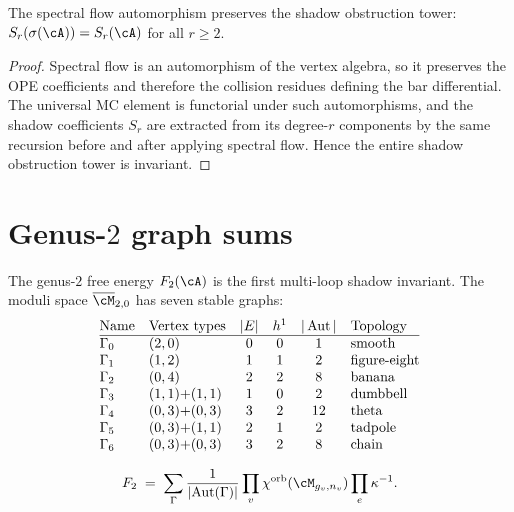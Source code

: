 \begin{proposition}
\label{prop:comp-n2-spectral-flow}
\ClaimStatusProvedHere
The spectral flow automorphism preserves the shadow obstruction tower:
$S_r(\sigma(\cA)) = S_r(\cA)$ for all $r \geq 2$.
\end{proposition}

\begin{proof}
Spectral flow is an automorphism of the vertex algebra, so it
preserves the OPE coefficients and therefore the collision residues
defining the bar differential. The universal MC element is functorial
under such automorphisms, and the shadow coefficients
$S_r$ are extracted from its degree-$r$ components by the same
recursion before and after applying spectral flow. Hence the entire
shadow obstruction tower is invariant.
\end{proof}


\section{Genus-$2$ graph sums}
\label{sec:comp-genus2}

The genus-$2$ free energy $F_2(\cA)$ is the first multi-loop
shadow invariant. The moduli space $\overline{\cM}_{2,0}$ has
seven stable graphs:
\[
\begin{array}{@{}llcccl@{}}
 \text{Name} & \text{Vertex types} & |E| & h^1
 & |\operatorname{Aut}| & \text{Topology} \\
\hline
 \Gamma_0 & (2,0) & 0 & 0 & 1 & \text{smooth} \\
 \Gamma_1 & (1,2) & 1 & 1 & 2 & \text{figure-eight} \\
 \Gamma_2 & (0,4) & 2 & 2 & 8 & \text{banana} \\
 \Gamma_3 & (1,1){+}(1,1) & 1 & 0 & 2 & \text{dumbbell} \\
 \Gamma_4 & (0,3){+}(0,3) & 3 & 2 & 12 & \text{theta} \\
 \Gamma_5 & (0,3){+}(1,1) & 2 & 1 & 2 & \text{tadpole} \\
 \Gamma_6 & (0,3){+}(0,3) & 3 & 2 & 8 & \text{chain}
\end{array}
\]

\begin{equation}\label{eq:comp-f2-graph-sum}
 F_2 \;=\;
 \sum_{\Gamma} \frac{1}{|\!\operatorname{Aut}(\Gamma)|}
 \prod_{v} \chi^{\mathrm{orb}}(\cM_{g_v, n_v})
 \prod_{e} \kappa^{-1}.
\end{equation}

